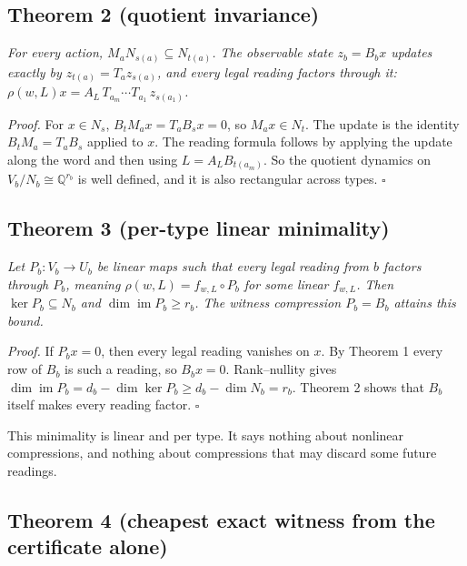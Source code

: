 \documentclass[
  11pt,
  a4paper,
]{report}
\begin{document}
\hypertarget{theorem-2-quotient-invariance}{%
\subsection{Theorem 2 (quotient
invariance)}\label{theorem-2-quotient-invariance}}

\emph{For every action, \(M_aN_{s(a)}\subseteq N_{t(a)}\). The
observable state \(z_b=B_bx\) updates exactly by
\(z_{t(a)}=T_az_{s(a)}\), and every legal reading factors through it:
\(\rho(w,L)x=A_L\,T_{a_m}\cdots T_{a_1}\,z_{s(a_1)}\).}

\emph{Proof.} For \(x\in N_s\), \(B_tM_ax=T_aB_sx=0\), so
\(M_ax\in N_t\). The update is the identity \(B_tM_a=T_aB_s\) applied to
\(x\). The reading formula follows by applying the update along the word
and then using \(L=A_LB_{t(a_m)}\). So the quotient dynamics on
\(V_b/N_b\cong\mathbb{Q}^{r_b}\) is well defined, and it is also
rectangular across types. \(\square\)

\hypertarget{theorem-3-per-type-linear-minimality}{%
\subsection{Theorem 3 (per-type linear
minimality)}\label{theorem-3-per-type-linear-minimality}}

\emph{Let \(P_b:V_b\to U_b\) be linear maps such that every legal
reading from \(b\) factors through \(P_b\), meaning
\(\rho(w,L)=f_{w,L}\circ P_b\) for some linear \(f_{w,L}\). Then
\(\ker P_b\subseteq N_b\) and \(\dim\operatorname{im}P_b\ge r_b\). The
witness compression \(P_b=B_b\) attains this bound.}

\emph{Proof.} If \(P_bx=0\), then every legal reading vanishes on \(x\).
By Theorem 1 every row of \(B_b\) is such a reading, so \(B_bx=0\).
Rank--nullity gives
\(\dim\operatorname{im}P_b=d_b-\dim\ker P_b\ge d_b-\dim N_b=r_b\).
Theorem 2 shows that \(B_b\) itself makes every reading factor.
\(\square\)

This minimality is linear and per type. It says nothing about nonlinear
compressions, and nothing about compressions that may discard some
future readings.

\hypertarget{theorem-4-cheapest-exact-witness-from-the-certificate-alone}{%
\subsection{Theorem 4 (cheapest exact witness from the certificate
alone)}\label{theorem-4-cheapest-exact-witness-from-the-certificate-alone}}
\end{document}
